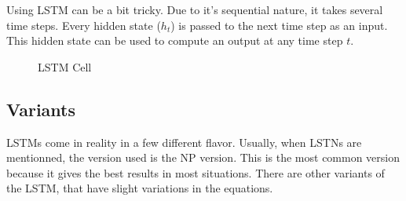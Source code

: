 Using \ac{LSTM} can be a bit tricky. Due to it's sequential nature, it takes several time steps. Every hidden state ($h_t$) is passed to the next time step as an input. This hidden state can be used to compute an output at any time step $t$.

\begin{figure}[H]
  \centering
  
  \caption{LSTM Cell}
  \label{fig:lstmCell}
\end{figure}

\subsection{Variants}

\acp{LSTM} come in reality in a few different flavor. Usually, when \acp{LSTN} are mentionned, the version used is the \ac{NP} version. This is the most common version because it gives the best results in most situations.
There are other variants of the \ac{LSTM}, that have slight variations in the equations.
